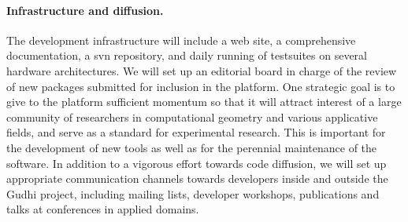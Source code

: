 \paragraph{Infrastructure and diffusion.}
The development infrastructure will include a web site, a
comprehensive documentation, a svn repository, and daily running of
testsuites on several hardware architectures.  We will set up an
editorial board in charge of the review of new packages
submitted for inclusion in the platform.  One strategic goal is to
give to the platform sufficient momentum so that it will  attract
interest of a large community of researchers in computational geometry
and various applicative fields, and serve as a standard for
experimental research. This is important for the development of new
tools as well as for the perennial maintenance of the software. In
addition to a vigorous effort towards code diffusion, we will set up
appropriate communication channels towards developers inside and
outside the Gudhi project, including mailing lists, developer
workshops, publications and talks at conferences in applied domains.















